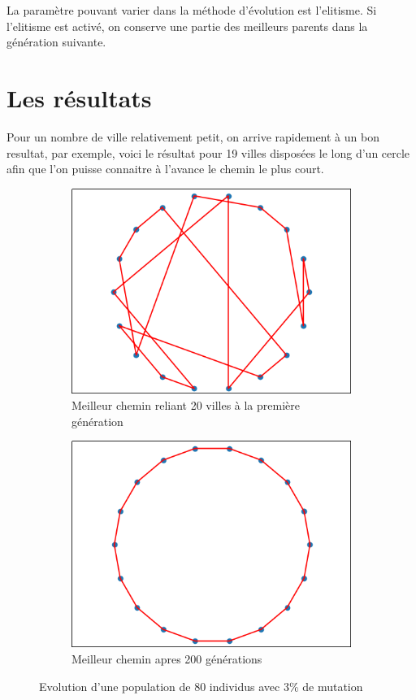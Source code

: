 \documentclass[11pt]{article}
\begin{document}
La paramètre pouvant varier dans la méthode d'évolution est l'elitisme. Si l'elitisme
est activé, on conserve une partie des meilleurs parents dans la génération suivante.

\section{Les résultats}
\label{sec-3}

Pour un nombre de ville relativement petit, on arrive rapidement à un bon resultat, par exemple, voici le résultat pour 19 villes disposées
le long d'un cercle afin que l'on puisse connaitre à l'avance le chemin le plus court.

\begin{figure}[h]
    \begin{subfigure}{.5\textwidth}
        \includegraphics[width=.9\linewidth]{./gen1.png}
        \caption{Meilleur chemin reliant 20 villes à la première génération}
    \end{subfigure}
    \begin{subfigure}{.5\textwidth}
        \includegraphics[width=.9\linewidth]{./gen200.png}
        \caption{Meilleur chemin apres 200 générations}
    \end{subfigure}
    \caption{Evolution d'une population de 80 individus avec 3\% de mutation}
\end{figure}
\end{document}
